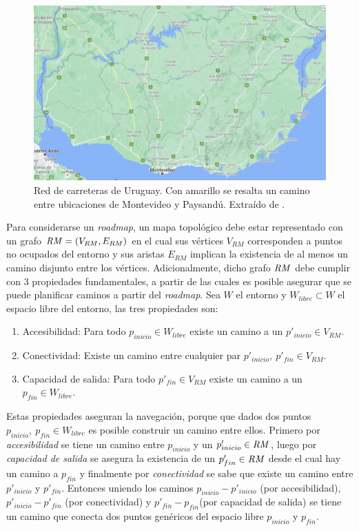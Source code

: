 \begin{figure}[H]
  \center
  \includegraphics[width=0.9\linewidth]{imagenes/uruguayvialMarcado.png}
  \caption[Red de carreteras de Uruguay.]{Red de carreteras de Uruguay. Con amarillo se resalta un camino entre ubicaciones de Montevideo y Paysandú. Extraído de \cite{googlemaps}.}\label{fig:ejemplovial}
\end{figure} 

Para considerarse un \emph{roadmap}, un mapa topológico debe estar representado
con un grafo $\mathit{RM}=(V_{RM},E_{RM})$ en el cual sus vértices $V_{RM}$
corresponden a puntos no ocupados del entorno y sus aristas $E_{RM}$
implican la existencia de al menos un camino disjunto entre los
vértices. Adicionalmente, dicho grafo $\mathit{RM}$ debe cumplir con 3
propiedades fundamentales, a partir de las cuales es posible asegurar
que se puede planificar caminos a partir del \emph{roadmap}. Sea $W$ el entorno
y $W_{libre} \subset W$ el espacio libre del entorno, las tres
propiedades son:

\begin{enumerate}
  \item Accesibilidad: Para todo $p_{inicio} \in W_{libre}$ existe un camino a un $p'_{inicio}\in V_{RM}$. %
  \item Conectividad: Existe un camino entre cualquier par $p'_{inicio},\ p'_{fin} \in V_{RM}$.
  \item Capacidad de salida: Para todo $p'_{fin} \in V_{RM}$ existe un camino a un $p_{fin} \in W_{libre}$.
\end{enumerate}

Estas propiedades aseguran la navegación, porque que dados dos puntos $p_{inicio},\ p_{fin}\in W_{libre}$ es posible construir un camino entre ellos. Primero por \emph{accesibilidad} se tiene un camino entre $p_{inicio}$ y un $p'_{inicio}\in \mathit{RM}$, luego por \emph{capacidad de salida} se asegura la existencia de un  $p'_{fin}\in \mathit{RM}$ desde el cual hay un camino a $p_{fin}$ y finalmente por \emph{conectividad} se sabe que existe un camino entre $p'_{inicio}$ y $p'_{fin}$. Entonces uniendo los caminos $p_{inicio} - p'_{inicio}$ (por accesibilidad), $p'_{inicio} - p'_{fin}$ (por conectividad) y $p'_{fin} - p_{fin}$(por capacidad de salida) se tiene un camino que conecta dos puntos genéricos del espacio libre $p_{inicio}$ y $p_{fin}$.

